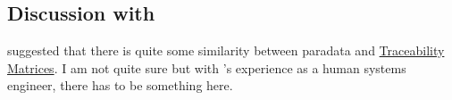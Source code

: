 \documentclass[class=article, crop=false]{standalone}
\begin{document}
\subsection{Discussion with }
\label{second}

 suggested that there is quite some similarity between paradata and \href{https://en.wikipedia.org/wiki/Traceability_matrix?useskin=vector}{Traceability Matrices}.
I am not quite sure but with 's experience as a human systems engineer, there has to be something here.
 
\printbibliography
\end{document}
